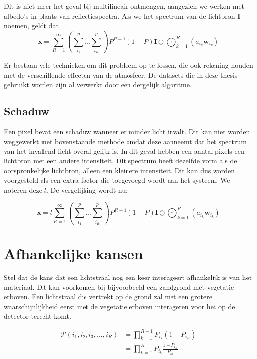 \documentclass[12pt]{report}
\DeclareMathOperator*{\Odot}{\bigodot}
\begin{document}
Dit is niet meer het geval bij multilineair ontmengen, aangezien we werken met albedo's in plaats van reflectiespectra. Als we het spectrum van de lichtbron $\bm{I}$ noemen, geldt dat 
\begin{equation}
\bm{x} = \sum_{R=1}^{\infty} \left(\sum_{i_1}^{p} ... \sum_{i_R}^{p}\right)P^{R-1} (1-P) \bm{I}\odot\Odot_{k=1}^R \left(a_{i_k} \bm{w}_{i_k}\right)
\end{equation}

Er bestaan vele technieken om dit probleem op te lossen, die ook rekening houden met de verschillende effecten van de atmosfeer. De datasets die in deze thesis gebruikt worden zijn al verwerkt door een dergelijk algoritme. 


\subsection{Schaduw}

Een pixel bevat een schaduw wanneer er minder licht invalt. Dit kan niet worden weggewerkt met bovenstaande methode omdat deze aanneemt dat het spectrum van het invallend licht overal gelijk is.
In dit geval hebben een aantal pixels een lichtbron met een andere intensiteit. Dit spectrum heeft dezelfde vorm als de oorspronkelijke lichtbron, alleen een kleinere intensiteit. Dit kan dus worden voorgesteld als een extra factor die toegevoegd wordt aan het systeem. We noteren deze $l$. De vergelijking wordt nu:

\begin{equation}
\bm{x} = l\sum_{R=1}^{\infty} \left(\sum_{i_1}^{p} ... \sum_{i_R}^{p}\right)P^{R-1} (1-P) \bm{I}\odot\Odot_{k=1}^R \left(a_{i_k} \bm{w}_{i_k}\right)
\end{equation}

\section{Afhankelijke kansen} \label{sec:Pi}

Stel dat de kans dat een lichtstraal nog een keer interageert afhankelijk is van het materiaal. Dit kan voorkomen bij bijvoorbeeld een zandgrond met vegetatie erboven. Een lichtstraal die vertrekt op de grond zal met een grotere waarschijnlijkheid eerst met de vegetatie erboven interageren voor het op de detector terecht komt.

\begin{align}
\mathcal{P}(i_1,i_2,i_3,...,i_R) &= \prod_{k=1}^{R-1}P_{i_k} (1-P_{i_R})\\
&= \prod_{k=1}^{R}P_{i_k} \frac{1-P_{i_R}}{P_{i_R}}
\end{align}
\end{document}
